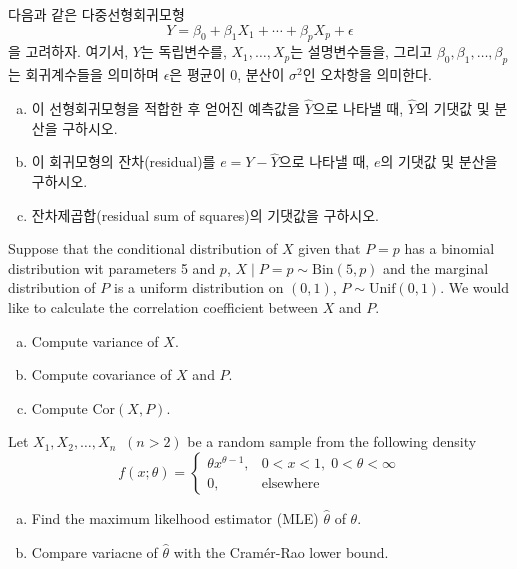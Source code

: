 \documentclass[answers]{exam}
\begin{document}
\newpage
{}
\begin{questions}
   \question
    다음과 같은 다중선형회귀모형
    $$
      Y=\beta_{0}+\beta_{1}X_{1}+\cdots+\beta_{p}X_{p}+\epsilon
    $$
    을 고려하자. 여기서, $Y$는 독립변수를, $X_{1},\ldots,X_{p}$는 설명변수들을, 그리고 $\beta_{0},\beta_{1},\ldots,\beta_{p}$는 회귀계수들을 의미하며 $\epsilon$은 평균이 0, 분산이 $\sigma^{2}$인 오차항을 의미한다.
    \begin{enumerate}[(a)]
      \item 이 선형회귀모형을 적합한 후 얻어진 예측값을 $\widehat{Y}$으로 나타낼 때, $\widehat{Y}$의 기댓값 및 분산을 구하시오.
      \item 이 회귀모형의 잔차(residual)를 $e=Y-\widehat{Y}$으로 나타낼 때, $e$의 기댓값 및 분산을 구하시오.
      \item 잔차제곱합(residual sum of squares)의 기댓값을 구하시오.
    \end{enumerate}
    \begin{solution}

    \end{solution}
    \question
    Suppose that the conditional distribution of $X$ given that $P=p$ has a binomial distribution wit parameters 5 and $p$, $X\;|\;P=p \sim \mathrm{Bin}\left(5,p\right)$ and the marginal distribution of $P$ is a uniform distribution on $(0,1)$, $P\sim \mathrm{Unif}\left(0,1\right)$. We would like to calculate the correlation coefficient between $X$ and $P$.
    \begin{enumerate}[(a)]
      \item Compute variance of $X$.
      \item Compute covariance of $X$ and $P$.
      \item Compute $\mathrm{Cor}\left(X,P\right)$.
    \end{enumerate}
    \begin{solution}

    \end{solution}
    \question
    Let $X_{1},X_{2},\ldots,X_{n}\;\;\left(n>2\right)$ be a random sample from the following density
    $$
      f\left(x;\theta\right)=\begin{cases}\theta x^{\theta-1}, & 0<x<1,\;0<\theta<\infty \\ 0, & \text{elsewhere}\end{cases}
    $$
    \begin{enumerate}[(a)]
      \item Find the maximum likelhood estimator (MLE) $\widehat{\theta}$ of $\theta$.
      \item Compare variacne of $\widehat{\theta}$ with the Cramér-Rao lower bound.
    \end{enumerate}
    \begin{solution}


\end{solution}
\end{questions}
\end{document}
